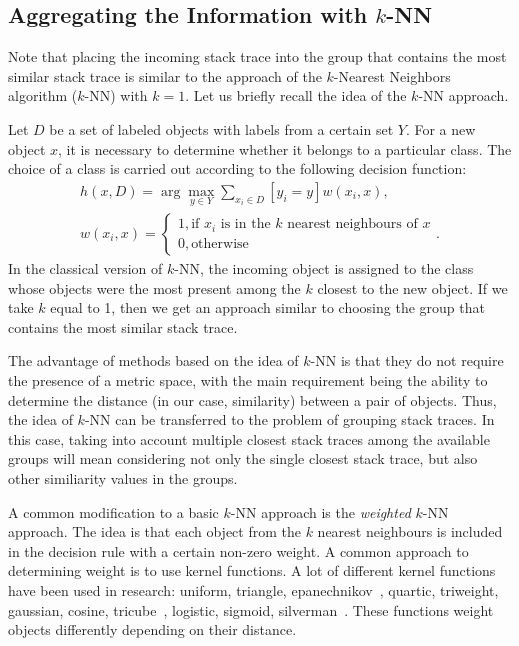 \subsection{Aggregating the Information with $k$-NN}
\label{sec:knn}

Note that placing the incoming stack trace into the group that contains the most similar stack trace is similar to the approach of the $k$-Nearest Neighbors algorithm ($k$-NN) with $k=1$. Let us briefly recall the idea of the $k$-NN approach.

Let $D$ be a set of labeled objects with labels from a certain set $Y$.
For a new object $x$, it is necessary to determine whether it belongs to a particular class.
The choice of a class is carried out according to the following decision function:
\begin{gather*}
    h(x, D) = \arg\max_{y \in Y}\sum_{x_i\in D}[y_i = y]w(x_i, x),\\
    w(x_i, x) = \begin{cases}1, \text{if $x_i$ is in the $k$ nearest neighbours of $x$}\\ 0, \text{otherwise}\end{cases}.
\end{gather*}
In the classical version of $k$-NN, the incoming object is assigned to the class whose objects were the most present among the $k$ closest to the new object.
If we take $k$ equal to 1, then we get an approach similar to choosing the group that contains the most similar stack trace.

The advantage of methods based on the idea of $k$-NN is that they do not require the presence of a metric space, with the main requirement being the ability to determine the distance (in our case, similarity) between a pair of objects.
Thus, the idea of $k$-NN can be transferred to the problem of grouping stack traces. 
In this case, taking into account multiple closest stack traces among the available groups will mean considering not only the single closest stack trace, but also other similiarity values in the groups.

A common modification to a basic $k$-NN approach is the \textit{weighted} $k$-NN approach.
The idea is that each object from the $k$ nearest neighbours is included in the decision rule with a certain non-zero weight.
A common approach to determining weight is to use kernel functions.
A lot of different kernel functions have been used in research: uniform, triangle, epanechnikov~\cite{epanechnikov}, quartic, triweight, gaussian, cosine, tricube~\cite{tricube}, logistic, sigmoid, silverman~\cite{silverman}.
These functions weight objects differently depending on their distance.

